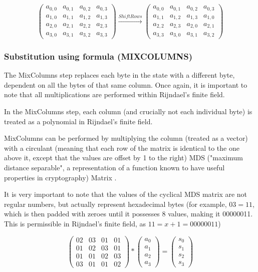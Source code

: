 \documentclass[12pt]{report}
\begin{document}
\[ \left( \begin{array}{cccc}
a_{0,0} & a_{0,1} & a_{0,2} & a_{0,3} \\
a_{1,0} & a_{1,1} & a_{1,2} & a_{1,3} \\
a_{2,0} & a_{2,1} & a_{2,2} & a_{2,3} \\
a_{3,0} & a_{3,1} & a_{3,2} & a_{3,3}\end{array} \right)
\xrightarrow{ShiftRows}
\left( \begin{array}{cccc}
a_{0,0} & a_{0,1} & a_{0,2} & a_{0,3} \\
a_{1,1} & a_{1,2} & a_{1,3} & a_{1,0} \\
a_{2,2} & a_{2,3} & a_{2,0} & a_{2,1} \\
a_{3,3} & a_{3,0} & a_{3,1} & a_{3,2}\end{array} \right)
\]

\subsubsection{Substitution using formula (MIXCOLUMNS)}
The MixColumns step replaces each byte in the state with a different byte, dependent on all the bytes of that same column. Once again, it is important to note that all multiplications are performed within Rijndael's finite field.

In the MixColumns step, each column (and crucially not each individual byte) is treated as a polynomial in Rijndael's finite field.

MixColumns can be performed by multiplying the column (treated as a vector) with a circulant (meaning that each row of the matrix is identical to the one above it, except that the values are offset by 1 to the right) MDS ("maximum distance separable", a representation of a function known to have useful properties in cryptography) Matrix \cite{MixColumns}.

It is very important to note that the values of the cyclical MDS matrix are not regular numbers, but actually represent hexadecimal bytes (for example, $03 = 11$, which is then padded with zeroes until it possesses 8 values, making it 00000011. This is permissible in Rijndael's finite field, as $11 = x+1 = 00000011$)

\[ \left( \begin{array}{cccc}
02 & 03 & 01 & 01 \\
01 & 02 & 03 & 01 \\
01 & 01 & 02 & 03 \\
03 & 01 & 01 & 02\end{array} \right)
*
\left( \begin{array}{c}
a_0 \\
a_1 \\
a_2 \\
a_3\end{array} \right)
=
\left( \begin{array}{c}
s_0 \\
s_1 \\
s_2 \\
s_3\end{array} \right)
\]
\end{document}
